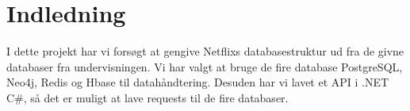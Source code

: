 \section{Indledning}
I dette projekt har vi forsøgt at gengive Netflixs databasestruktur ud fra de givne databaser fra undervisningen. Vi har valgt at bruge de fire database PostgreSQL, Neo4j, Redis og Hbase til datahåndtering. Desuden har vi lavet et API i .NET C\#, så det er muligt at lave requests til de fire databaser.